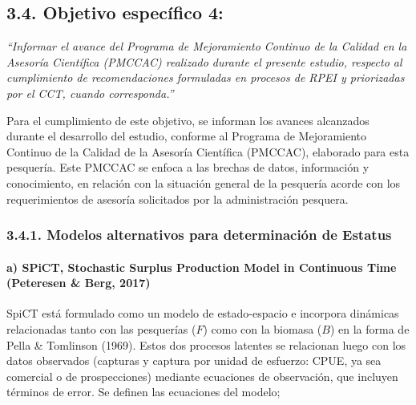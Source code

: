 \documentclass[
  spanish,
]{article}
\begin{document}
\hypertarget{objetivo-especuxedfico-4}{%
\subsection{3.4. Objetivo específico
4:}\label{objetivo-especuxedfico-4}}

\vspace{-0.2cm}

\emph{``Informar el avance del Programa de Mejoramiento Continuo de la
Calidad en la Asesoría Científica (PMCCAC) realizado durante el presente
estudio, respecto al cumplimiento de recomendaciones formuladas en
procesos de RPEI y priorizadas por el CCT, cuando corresponda.''}
\vspace{0.5cm}

Para el cumplimiento de este objetivo, se informan los avances
alcanzados durante el desarrollo del estudio, conforme al Programa de
Mejoramiento Continuo de la Calidad de la Asesoría Científica (PMCCAC),
elaborado para esta pesquería. Este PMCCAC se enfoca a las brechas de
datos, información y conocimiento, en relación con la situación general
de la pesquería acorde con los requerimientos de asesoría solicitados
por la administración pesquera.

\hypertarget{modelos-alternativos-para-determinaciuxf3n-de-estatus}{%
\subsubsection{3.4.1. Modelos alternativos para determinación de
Estatus}\label{modelos-alternativos-para-determinaciuxf3n-de-estatus}}

\hypertarget{a-spict-stochastic-surplus-production-model-in-continuous-time-peteresen-berg-2017}{%
\paragraph{a) SPiCT, Stochastic Surplus Production Model in Continuous
Time (Peteresen \& Berg,
2017)}\label{a-spict-stochastic-surplus-production-model-in-continuous-time-peteresen-berg-2017}}

\quad

SpiCT está formulado como un modelo de estado-espacio e incorpora
dinámicas relacionadas tanto con las pesquerías (\(F\)) como con la
biomasa (\(B\)) en la forma de Pella \& Tomlinson (1969). Estos dos
procesos latentes se relacionan luego con los datos observados (capturas
y captura por unidad de esfuerzo: CPUE, ya sea comercial o de
prospecciones) mediante ecuaciones de observación, que incluyen términos
de error. Se definen las ecuaciones del modelo;
\end{document}
